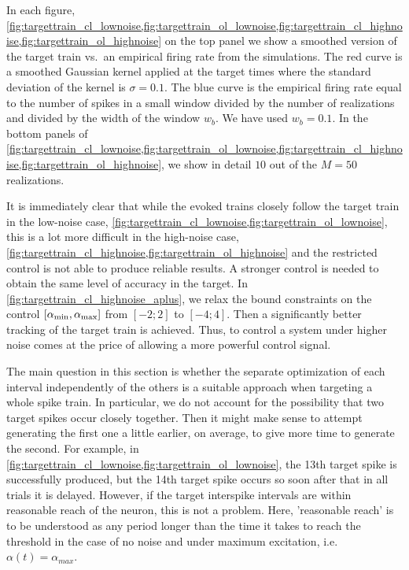 In each figure,
\cref{fig:targettrain_cl_lownoise,fig:targettrain_ol_lownoise,fig:targettrain_cl_highnoise,fig:targettrain_ol_highnoise}
on the top panel we show a smoothed version of the target train vs.\ an
empirical firing rate from the simulations. The red curve is a smoothed Gaussian
kernel applied at the target times where the standard deviation of the kernel is
$\sigma = 0.1$. The blue curve is the empirical firing rate equal to the number
of spikes in a small window divided by the number of realizations and divided by
the width of the window $w_b$. We have used $w_b = 0.1$. In the bottom panels of
\cref{fig:targettrain_cl_lownoise,fig:targettrain_ol_lownoise,fig:targettrain_cl_highnoise,fig:targettrain_ol_highnoise},
we show in detail $10$ out of the $M=50$ realizations.


It is immediately clear that while the evoked trains closely follow the target
train in the low-noise case,
\cref{fig:targettrain_cl_lownoise,fig:targettrain_ol_lownoise}, this is a lot
more difficult in the high-noise case,
\cref{fig:targettrain_cl_highnoise,fig:targettrain_ol_highnoise} and the
restricted control is not able to produce reliable results. A stronger
control is needed to obtain the same level of accuracy in the target. In
\cref{fig:targettrain_cl_highnoise_aplus}, we relax the bound constraints on the
control $[{ \alpha_{\textrm{min}} }, { \alpha_{\textrm{max}} }]$ from $[-2; 2]$ to $[-4; 4]$. Then a significantly
better tracking of the target train is achieved. Thus, to control a system under
higher noise comes at the price of allowing a more powerful control signal.

The main question in this section is whether the separate optimization of each
interval independently of the others is a suitable approach when targeting a
whole spike train. In particular, we do not account for the possibility that two
target spikes occur closely together. Then it might make sense to attempt
generating the first one a little earlier, on average, to give more time to
generate the second. For example, in
\cref{fig:targettrain_cl_lownoise,fig:targettrain_ol_lownoise}, the 13th target
spike is successfully produced, but the 14th target spike occurs so soon after
that in all trials it is delayed. However, if the target interspike intervals
are within reasonable reach of the neuron, this is not a problem. 
Here, 'reasonable reach' is to be understood as any period longer than
the time it takes to reach the threshold in the case of no noise and
under maximum excitation, i.e. $\alpha (t) = \alpha_{max}$.
 
